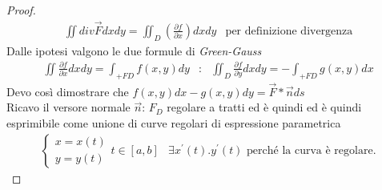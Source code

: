 \begin{proof}
	\begin{equation*}
		\begin{matrix}
			\iint div \vec{F} dxdy=\iint_{D} \left(\frac{\partial f}{\partial
			x}\right)dxdy & \text{per definizione divergenza}
		\end{matrix}
	\end{equation*}
	Dalle ipotesi valgono le due formule di \textit{\color{red}Green-Gauss}
	\begin{equation*}
		\begin{matrix}
			\iint \frac{\partial f}{\partial x}dxdy=\int_{+FD}f(x,y)dy &:&
			\iint_D \frac{\partial f}{\partial y}dxdy=-\int_{+FD}g(x,y)dx
		\end{matrix}
	\end{equation*}
	Devo così dimostrare che $f(x,y)dx-g(x,y)dy=\vec{F}*\vec{n}ds$\\
	Ricavo il versore normale $\vec{n}$: $F_D$ regolare a tratti ed è quindi ed
	è quindi esprimibile come unione di curve regolari di espressione
	parametrica
	\begin{equation*}
		\begin{matrix}
			\begin{cases}
				x=x(t)\\
				y=y(t)
			\end{cases} t\in [a,b] & \exists x^\prime(t).y^\prime(t)\text{ perché la
			curva è regolare.}


\end{matrix}
\end{equation*}
\end{proof}
